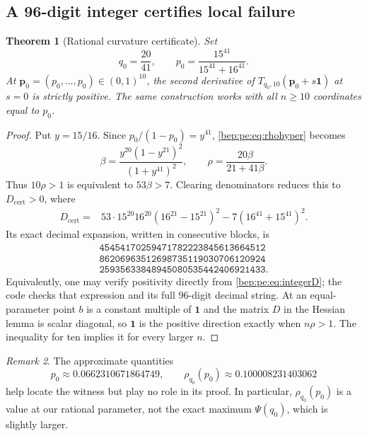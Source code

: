 \documentclass[11pt]{article}
\numberwithin{equation}{section}
\newtheorem{theorem}{Theorem}[section]
\theoremstyle{definition}
\theoremstyle{remark}
\newtheorem{remark}[theorem]{Remark}
\newcommand{\p}{\boldsymbol p}
\newcommand{\one}{\boldsymbol 1}
\begin{document}
\subsection{A 96-digit integer certifies local failure}
\begin{theorem}[Rational curvature certificate]\label{bep:pe:thm:exact}
Set
\begin{equation}
 q_0=\frac{20}{41},\qquad
 p_0=\frac{15^{41}}{15^{41}+16^{41}}.
 \label{bep:pe:eq:witnessparameters}
\end{equation}
At $\p_0=(p_0,\ldots,p_0)\in(0,1)^{10}$, the second derivative of
$T_{q_0,10}(\p_0+s\one)$ at $s=0$ is strictly positive.
The same construction works with all $n\geq10$ coordinates equal to
$p_0$.
\end{theorem}
\begin{proof}
Put $y=15/16$. Since $p_0/(1-p_0)=y^{41}$,
\eqref{bep:pe:eq:rhohyper} becomes
\begin{equation}
 \beta=\frac{y^{20}(1-y^{21})^2}{(1+y^{41})^2},\qquad
 \rho=\frac{20\beta}{21+41\beta}.\label{bep:pe:eq:rationalrho}
\end{equation}
Thus $10\rho>1$ is equivalent to $53\beta>7$. Clearing denominators
reduces this to $D_{\mathrm{cert}}>0$, where
\begin{align}
 D_{\mathrm{cert}}={}&53\cdot15^{20}16^{20}(16^{21}-15^{21})^2
       -7(16^{41}+15^{41})^2.\label{bep:pe:eq:integerD}
\end{align}
Its exact decimal expansion, written in consecutive blocks, is
\begin{equation}
\begin{gathered}
\texttt{45454170259471782223845613664512}\\[-.2em]
\texttt{86206963512698735119030706120924}\\[-.2em]
\texttt{25935633848945080535442406921433}.
\end{gathered}\label{bep:pe:eq:Ddigits}
\end{equation}
Equivalently, one may verify positivity directly from
\eqref{bep:pe:eq:integerD}; the code checks that expression and its full
96-digit decimal string. At an equal-parameter point $b$ is a constant
multiple of $\one$ and the matrix $D$ in the Hessian lemma is scalar diagonal,
so $\one$ is the positive direction exactly when $n\rho>1$.
The inequality for ten implies it for every larger $n$.
\end{proof}

\begin{remark}
The approximate quantities
\[
 p_0\approx0.0662310671864749,\qquad
 \rho_{q_0}(p_0)\approx0.100008231403062
\]
help locate the witness but play no role in its proof. In particular,
$\rho_{q_0}(p_0)$ is a value at our rational parameter, not the exact
maximum $\Psi(q_0)$, which is slightly larger.
\end{remark}
\end{document}
